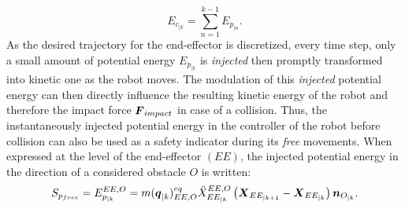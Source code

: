 \begin{equation}
E_{c_{|k}} = \sum\limits_{n=1}^{k-1} E_{p_{|n}}.
\label{eq:Ec_eq_sum_Ep_a}
\end{equation}
As the desired trajectory for the end-effector is discretized, every time step, only a small amount of potential energy $E_{p_{|k}}$ is \textit{injected} then promptly transformed into kinetic one as the robot moves. The modulation of this \textit{injected} potential energy can then directly influence the resulting kinetic energy of the robot and therefore the impact force $\mbox{\boldmath${F}$}_{impact}$ in case of a collision. Thus, the instantaneously injected potential energy in the controller of the robot before collision can also be used as a safety indicator during its \textit{free} movements. When expressed at the level of the end-effector $(EE)$, the injected potential energy in the direction of a considered obstacle $O$ is written:
\begin{equation}
S_{p_{free}} = E_{p_{|k}}^{EE,O} = m(\mbox{\boldmath${q}$}_{|k})_{EE,O}^{eq} \ddot{X}_{EE_{|k}}^{EE,O} \left(\mbox{\boldmath${X}$}_{EE_{|k+1}} - \mbox{\boldmath${X}$}_{EE_{|k}}\right) \mbox{\boldmath${n}$}_{O_{|k}}.
\label{eq:Sp_free_mvts}
\end{equation}
